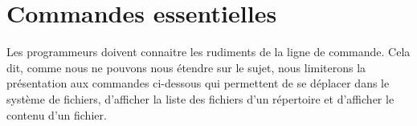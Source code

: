 \section{Commandes essentielles}
\label{sec:cli:commandes}

Les programmeurs doivent connaitre les rudiments de la ligne de
commande. Cela dit, comme nous ne pouvons nous étendre sur le sujet,
nous limiterons la présentation aux commandes ci-dessous qui
permettent de se déplacer dans le système de fichiers, d'afficher la
liste des fichiers d'un répertoire et d'afficher le contenu d'un
fichier.



